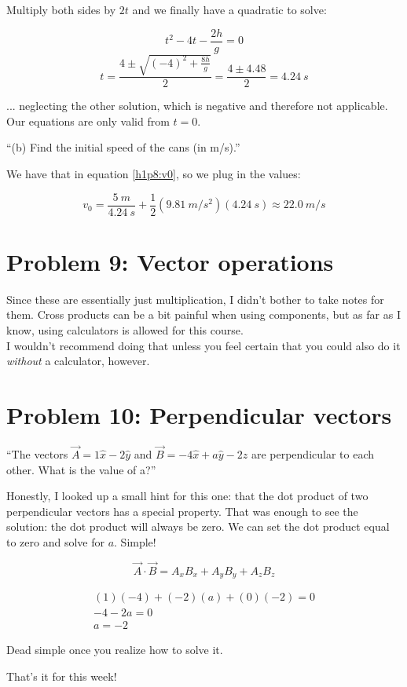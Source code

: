 \documentclass[8.01x]{subfiles}
\begin{document}
Multiply both sides by $2t$ and we finally have a quadratic to solve:

\begin{equation}
t^2 - 4t - \frac{2h}{g} = 0
\end{equation}
\begin{equation}
t = \frac{4 \pm \sqrt{(-4)^2 + \frac{8h}{g}}}{2} = \frac{4 \pm 4.48}{2} = \SI{4.24}{s}
\end{equation}

... neglecting the other solution, which is negative and therefore not applicable. Our equations are only valid from $t = 0$.

``(b) Find the initial speed of the cans (in m/s).''

We have that in equation \eqref{h1p8:v0}, so we plug in the values:

\begin{equation}
v_0 = \frac{\SI{5}{m}}{\SI{4.24}{s}} + \frac{1}{2} (\SI{9.81}{m/s^2}) (\SI{4.24}{s}) \approx \SI{22.0}{m/s}
\end{equation}

\section{Problem 9: Vector operations}

Since these are essentially just multiplication, I didn't bother to take notes for them. Cross products can be a bit painful when using components, but as far as I know, using calculators is allowed for this course.\\
I wouldn't recommend doing that unless you feel certain that you could also do it \emph{without} a calculator, however.

\section{Problem 10: Perpendicular vectors}

``The vectors $\vec{A} = 1 \hat{x} - 2 \hat{y}$ and $\vec{B} = -4 \hat{x} + a \hat{y} - 2\hat{z}$ are perpendicular to each other. What is the value of a?''

Honestly, I looked up a small hint for this one: that the dot product of two perpendicular vectors has a special property. That was enough to see the solution: the dot product will always be zero. We can set the dot product equal to zero and solve for $a$. Simple!

\begin{equation}
\vec{A} \cdot \vec{B} = A_x B_x + A_y B_y + A_z B_z
\end{equation}

\begin{align}
(1)(-4) + (-2)(a) + (0)(-2) = 0\\
-4 - 2a = 0\\
a = -2
\end{align}

Dead simple once you realize how to solve it.

That's it for this week!
\end{document}
